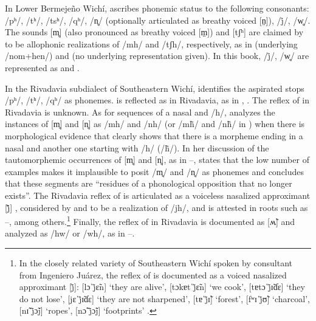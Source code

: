 In Lower Bermejeño Wichí, \citet[49–53]{VN14} ascribes phonemic status to the following consonants: /pʰ/, /tʰ/, /tsʰ/, /qʰ/, /n̥/ (optionally articulated as breathy voiced [n̤]), /j̊/, /w̥/. The sounds [m̥] (also pronounced as breathy voiced [m̤]) and [tʃʰ] are claimed by \citet{VN14} to be allophonic realizations of /mh/ and /tʃh/, respectively, as in  (underlying /nom+hen/) and  (no underlying representation given). In this book, /j̊/, /w̥/ are represented as  and .

In the Rivadavia subdialect of Southeastern Wichí, \citet[27–30]{JT09-th} identifies the aspirated stops /pʰ/, /tʰ/, /qʰ/ as phonemes.  is reflected as  in Rivadavia, as in , . The reflex of  in Rivadavia is unknown. As for sequences of a nasal and /h/, \citet[38–41]{JT09-th} analyzes the instances of [m̥] and [n̥] as /mh/ and /nh/ (or /mh̃/ and /nh̃/ in ) when there is morphological evidence that clearly shows that there is a morpheme ending in a nasal and another one starting with /h/ (/h̃/). In her discussion of the tautomorphemic occurrences of [m̥] and [n̥], as in –, \citet[41]{JT09-th} states that the low number of examples makes it implausible to posit /m̥/ and /n̥/ as phonemes and concludes that these segments are ``residues of a phonological opposition that no longer exists''. The Rivadavia reflex of  is articulated as a voiceless nasalized approximant [j̃̊] \recind [h̃j̃], considered by \citet[48]{JT09-th} and \citet[79]{JT09-cap} to be a realization of /jh/, and is attested in roots such as –, among others.\footnote{In the closely related variety of Southeastern Wichí spoken by  consultant from Ingeniero Juárez, the reflex of  is documented as a voiced nasalized approximant [j̃]: [lɔˈj̃ɛ̃n] `they are alive', [tɔkɐtˈj̃ɛ̃n] `we cook', [tɐtɔˈj̃ɪ̃ɗɛ] `they do not lose', [jɛˈj̃ɪ̃ɗɛ] `they are not sharpened', [tɐˈj̃ɪ̃] `forest', [fʷɪˈj̃ʊ̃] `charcoal', [nɪ̃ˈj̃ɔ̃j] `ropes', [nɔ̃ˈj̃ɔ̃j] `footprints' \citep[102–103]{LCB-MBC09}.} Finally, the reflex of  in Rivadavia is documented as [ʍ̃] and analyzed as /hw/ or /wh/, as in –.

